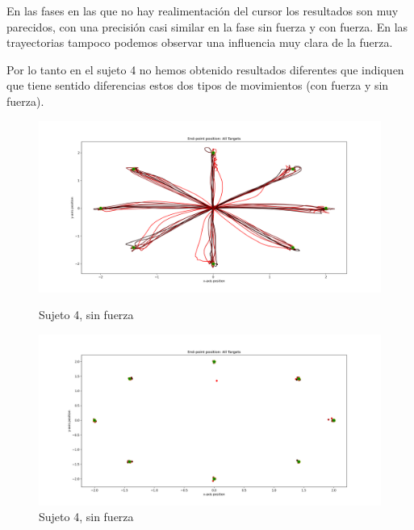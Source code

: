 \documentclass[a4paper,11pt, oneside]{book}
\begin{document}
En las fases en las que no hay realimentación del cursor los resultados son muy parecidos, con una precisión casi similar en la fase sin fuerza y con fuerza. En las trayectorias tampoco podemos observar una influencia muy clara de la fuerza.

Por lo tanto en el sujeto 4 no hemos obtenido resultados diferentes que indiquen que tiene sentido diferencias estos dos tipos de movimientos (con fuerza y sin fuerza).

\begin{figure}[H]
	\begin{minipage}[b]{0.5\linewidth}
		\centering
		\includegraphics[width=\linewidth]{sujeto4/no_force/trayectorias}
		\caption{Sujeto 4, sin fuerza}
		\label{fig:figura1}
	\end{minipage}
	\hspace{0.5cm}
	\begin{minipage}[b]{0.5\linewidth}
		\centering
		\includegraphics[width=\linewidth]{sujeto4/no_force/trayectorias_puntos}
		\caption{Sujeto 4, sin fuerza}
		\label{fig:figura2}
	\end{minipage}
\end{figure}
\end{document}
